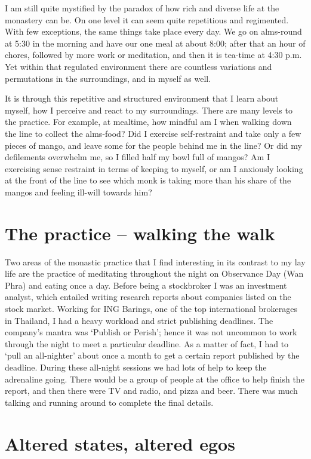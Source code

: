 I am still quite mystified by the paradox of how rich and diverse life
at the monastery can be. On one level it can seem quite repetitious and
regimented. With few exceptions, the same things take place every day. 
We go on alms-round at 5:30 in the morning and have our one meal at
about 8:00; after that an hour of chores, followed by more work or
meditation, and then it is tea-time at 4:30 p.m. Yet within that
regulated environment there are countless variations and permutations in
the surroundings, and in myself as well.

It is through this repetitive
and structured environment that I learn about myself, how I perceive and
react to my surroundings. There are many levels to the practice. For
example, at mealtime, how mindful am I when walking down the line to
collect the alms-food? Did I exercise self-restraint and take only a few
pieces of mango, and leave some for the people behind me in the line? Or
did my defilements overwhelm me, so I filled half my bowl full of
mangos? Am I exercising sense restraint in terms of keeping to myself, 
or am I anxiously looking at the front of the line to see which monk is
taking more than his share of the mangos and feeling ill-will towards
him? 

\section{The practice -- walking the walk}

Two areas of the monastic practice that I find interesting in its
contrast to my lay life are the practice of meditating throughout the
night on Observance Day (Wan Phra) and eating once a day. Before being a
stockbroker I was an investment analyst, which entailed writing research
reports about companies listed on the stock market. Working for ING
Barings, one of the top international brokerages in Thailand, I had a
heavy workload and strict publishing deadlines. The company's mantra was
`Publish or Perish'; hence it was not uncommon to work through the night
to meet a particular deadline. As a matter of fact, I had to `pull an
all-nighter' about once a month to get a certain report published by the
deadline. During these all-night sessions we had lots of help to keep
the adrenaline going. There would be a group of people at the office to
help finish the report, and then there were TV and radio, and pizza and
beer. There was much talking and running around to complete the final
details. 

\section{Altered states, altered egos}

